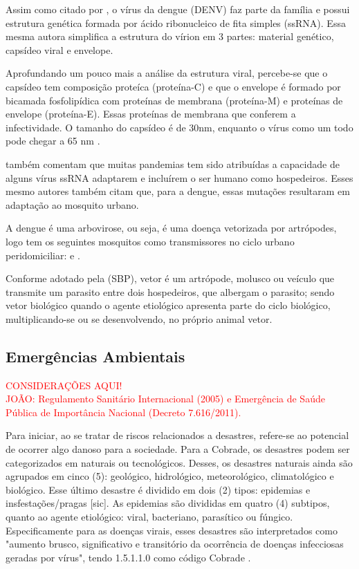 \indent Assim como citado por , o vírus da dengue (\acrfull{DENV}) faz parte da família  e possui estrutura genética formada por ácido ribonucleico de fita simples (\acrfull{ssRNA}). Essa mesma autora simplifica a estrutura do vírion em 3 partes: material genético, capsídeo viral e envelope.

\indent Aprofundando um pouco mais a análise da estrutura viral, percebe-se que o capsídeo tem composição proteíca (proteína-C) e que o envelope é formado por bicamada fosfolipídica com proteínas de membrana (proteína-M) e proteínas de envelope (proteína-E). Essas proteínas de membrana que conferem a infectividade. O tamanho do capsídeo é de 30nm, enquanto o vírus como um todo pode chegar a 65 nm \cite{Fiocruz2010Atlas}. 

 também comentam que muitas pandemias tem sido atribuídas a capacidade de alguns vírus \acrshort{ssRNA} adaptarem e incluírem o ser humano como hospedeiros. Esses mesmo autores também citam que, para a dengue, essas mutações resultaram em adaptação ao mosquito urbano.

\indent A dengue é uma arbovirose, ou seja, é uma doença vetorizada por artrópodes, logo tem os seguintes mosquitos como transmissores no ciclo urbano peridomiciliar:  e  \cite{ArboviralTransmission}.

\indent Conforme adotado pela  (\acrshort{SBP}), vetor é um artrópode, molusco ou veículo que transmite um parasito entre dois hospedeiros, que albergam o parasito; sendo vetor biológico quando o agente etiológico apresenta parte do ciclo biológico, multiplicando-se ou se desenvolvendo, no próprio animal vetor.

\subsection{Emergências Ambientais}

\begin{center}
\textcolor{red}{CONSIDERAÇÕES AQUI!}\\ 
\textcolor{red}{JOÃO: Regulamento Sanitário Internacional (2005) e Emergência de Saúde Pública de Importância Nacional (Decreto 7.616/2011).}
\end{center}

\indent Para iniciar, ao se tratar de riscos relacionados a desastres, refere-se ao
potencial de ocorrer algo danoso para a sociedade. Para a \acrfull{Cobrade}, os desastres podem ser categorizados em naturais ou tecnológicos. Desses, os desastres naturais ainda são agrupados em cinco (5): geológico, hidrológico, meteorológico, climatológico e biológico. Esse último desastre é dividido em dois (2) tipos: epidemias e insfestações/pragas [sic]. As epidemias são divididas em quatro (4) subtipos,  quanto ao agente etiológico: viral, bacteriano, parasítico ou fúngico. Especificamente para as doenças virais, esses desastres são interpretados como "aumento brusco, significativo e transitório da ocorrência de doenças infecciosas geradas por vírus", tendo 1.5.1.1.0 como código \acrshort{Cobrade} \cite{GIRD}.

